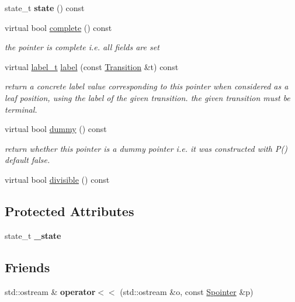 \begin{DoxyCompactItemize}
state\+\_\+t {\bfseries state} () const
\item 
virtual bool \mbox{\hyperlink{group__table_gace5bd2026fef480084f3cc5dc28086f3}{complete}} () const
\begin{DoxyCompactList}\small\item\em the pointer is complete i.\+e. all fields are set \end{DoxyCompactList}\item 
virtual \mbox{\hyperlink{group__output_ga22fde970e635fcf63962743b2d5c441d}{label\+\_\+t}} \mbox{\hyperlink{group__table_ga15067ad809b5ac25b45c0187550e0b17}{label}} (const \mbox{\hyperlink{classTransition}{Transition}} \&t) const
\begin{DoxyCompactList}\small\item\em return a concrete label value corresponding to this pointer when considered as a leaf position, using the label of the given transition. the given transition must be terminal. \end{DoxyCompactList}\item 
virtual bool \mbox{\hyperlink{group__table_ga0a994ec6827ef23556b500382fc5a1fc}{dummy}} () const
\begin{DoxyCompactList}\small\item\em return whether this pointer is a dummy pointer i.\+e. it was constructed with P() default false. \end{DoxyCompactList}\item 
virtual bool \mbox{\hyperlink{group__table_ga54817fbae1688dab4dfff5724e762640}{divisible}} () const
\end{DoxyCompactItemize}
\subsection*{Protected Attributes}
\begin{DoxyCompactItemize}
\item 
\mbox{\label{classSpointer_a27f37ac70c70f90d9a4a576606bb52e1}} 
state\+\_\+t {\bfseries \+\_\+state}
\end{DoxyCompactItemize}
\subsection*{Friends}
\begin{DoxyCompactItemize}
\item 
\mbox{\label{classSpointer_ad263d9daed9b87d43b2197cac98bced2}} 
std\+::ostream \& {\bfseries operator$<$$<$} (std\+::ostream \&o, const \mbox{\hyperlink{classSpointer}{Spointer}} \&p)
\end{DoxyCompactItemize}


